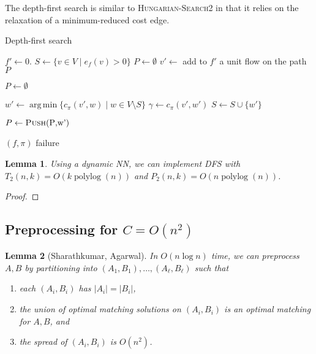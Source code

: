 \documentclass[11pt]{article}
\def\polylog{\mathop{\mathrm{polylog}}}
\DeclareMathOperator*{\argmin}{arg\,min}
\theoremstyle{plain}
\newtheorem{lemma}{Lemma}
\begin{document}
The depth-first search is similar to \textsc{Hungarian-Search2} in that it
relies on the relaxation of a minimum-reduced cost edge.
\begin{algorithm}
\caption{Depth-first search}
\begin{algorithmic}[1]
	\State $f' \gets 0$.
	\State $S \gets \{v \in V \mid e_f(v) > 0\}$
	\State $P \gets \emptyset$
	\Repeat
		\State $v' \gets$ 
			\State add to $f'$ a unit flow on the path $P$

			\State $P \gets \emptyset$
		\EndIf

		\Statex %
		\State $w' \gets \argmin\{c_\pi(v', w) \mid w \in V \setminus S\}$
		\State $\gamma \gets c_\pi(v', w')$
		\Statex %
			\State $S \gets S \cup \{w'\}$

			\State $P \gets \Call{Push}{$P$, $w'$}$

		\EndIf




		 
			\State\Return $(f, \pi)$
		\EndIf
	\State\Return failure
\EndFunction
\end{algorithmic}
\end{algorithm}


\begin{lemma}
\label{lemma:goldberg_dfs_time}
	Using a dynamic NN, we can implement \textsc{DFS} with
	$T_2(n, k) = O(k\polylog(n))$ and $P_2(n, k) = O(n\polylog(n))$.
\end{lemma}
\begin{proof}
\end{proof}








\subsection{Preprocessing for $C = O(n^2)$}

\begin{lemma}[Sharathkumar, Agarwal]
	In $O(n\log n)$ time, we can preprocess $A, B$ by partitioning into
	$(A_1, B_1), \ldots, (A_\ell, B_\ell)$ such that
	\begin{enumerate}
	\item each $(A_i, B_i)$ has $|A_i| = |B_i|$,
	\item the union of optimal matching solutions on $(A_i, B_i)$
		is an optimal matching for $A, B$, and
	\item the spread of $(A_i, B_i)$ is $O(n^2)$.
	\end{enumerate}
\end{lemma}
\end{document}
